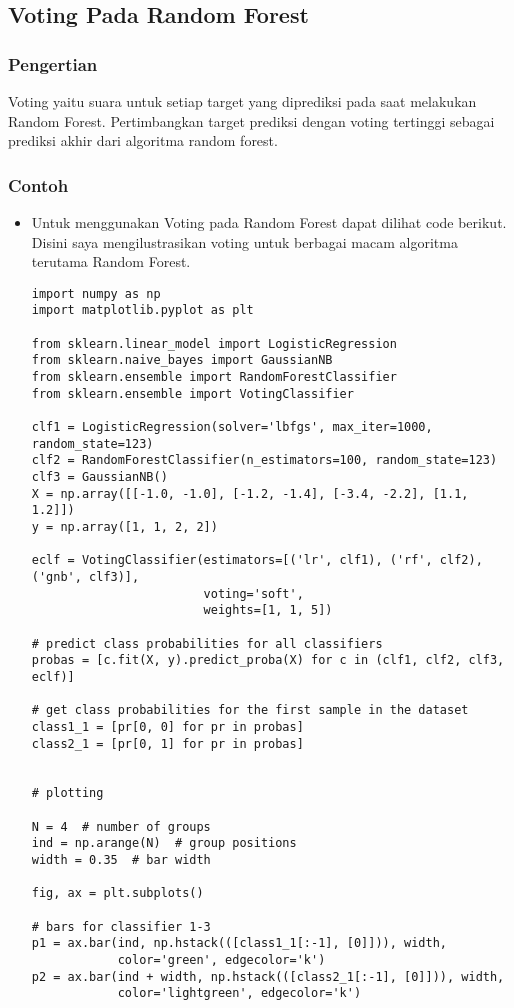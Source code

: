 \subsection{Voting Pada Random Forest}
\subsubsection{Pengertian}
Voting yaitu suara untuk setiap target yang diprediksi pada saat melakukan Random Forest. Pertimbangkan target prediksi dengan voting tertinggi sebagai prediksi akhir dari algoritma random forest.
\subsubsection{Contoh}
\begin{itemize}
\item
Untuk menggunakan Voting pada Random Forest dapat dilihat code berikut. Disini saya mengilustrasikan voting untuk berbagai macam algoritma terutama Random Forest.
\begin{verbatim}
import numpy as np
import matplotlib.pyplot as plt

from sklearn.linear_model import LogisticRegression
from sklearn.naive_bayes import GaussianNB
from sklearn.ensemble import RandomForestClassifier
from sklearn.ensemble import VotingClassifier

clf1 = LogisticRegression(solver='lbfgs', max_iter=1000, random_state=123)
clf2 = RandomForestClassifier(n_estimators=100, random_state=123)
clf3 = GaussianNB()
X = np.array([[-1.0, -1.0], [-1.2, -1.4], [-3.4, -2.2], [1.1, 1.2]])
y = np.array([1, 1, 2, 2])

eclf = VotingClassifier(estimators=[('lr', clf1), ('rf', clf2), ('gnb', clf3)],
                        voting='soft',
                        weights=[1, 1, 5])

# predict class probabilities for all classifiers
probas = [c.fit(X, y).predict_proba(X) for c in (clf1, clf2, clf3, eclf)]

# get class probabilities for the first sample in the dataset
class1_1 = [pr[0, 0] for pr in probas]
class2_1 = [pr[0, 1] for pr in probas]


# plotting

N = 4  # number of groups
ind = np.arange(N)  # group positions
width = 0.35  # bar width

fig, ax = plt.subplots()

# bars for classifier 1-3
p1 = ax.bar(ind, np.hstack(([class1_1[:-1], [0]])), width,
            color='green', edgecolor='k')
p2 = ax.bar(ind + width, np.hstack(([class2_1[:-1], [0]])), width,
            color='lightgreen', edgecolor='k')


\end{verbatim}
\end{itemize}
